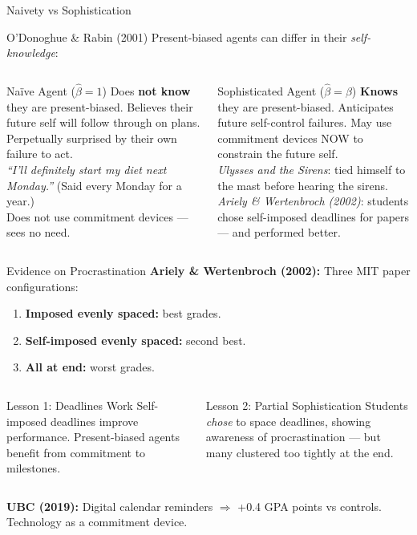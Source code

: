 \documentclass[aspectratio=169]{beamer}
\begin{document}
\begin{frame}{Naivety vs Sophistication}
\begin{block}{O'Donoghue \& Rabin (2001)}
Present-biased agents can differ in their \textit{self-knowledge}:
\end{block}
\begin{columns}
\begin{block}{\textcolor{berust}{Naïve Agent} ($\hat{\beta} = 1$)}
Does \textbf{not know} they are present-biased. Believes their future self will follow through on plans. Perpetually surprised by their own failure to act.\\[0.3em]
\textit{``I'll definitely start my diet next Monday.''} (Said every Monday for a year.)\\[0.3em]
Does not use commitment devices --- sees no need.
\end{block}
\begin{block}{\textcolor{beteal}{Sophisticated Agent} ($\hat{\beta} = \beta$)}
\textbf{Knows} they are present-biased. Anticipates future self-control failures. May use commitment devices NOW to constrain the future self.\\[0.3em]
\textit{Ulysses and the Sirens}: tied himself to the mast before hearing the sirens.\\[0.3em]
\textit{Ariely \& Wertenbroch (2002)}: students chose self-imposed deadlines for papers --- and performed better.
\end{block}
\end{columns}
\end{frame}

\begin{frame}{Evidence on Procrastination}
\textcolor{beblue}{\textbf{Ariely \& Wertenbroch (2002):}} Three MIT paper configurations:
\begin{enumerate}\small
  \item \textbf{Imposed evenly spaced:} best grades.
  \item \textbf{Self-imposed evenly spaced:} second best.
  \item \textbf{All at end:} worst grades.
\end{enumerate}
\begin{columns}
\begin{alertblock}{Lesson 1: Deadlines Work}
Self-imposed deadlines improve performance. Present-biased agents benefit from commitment to milestones.
\end{alertblock}
\begin{alertblock}{Lesson 2: Partial Sophistication}
Students \textit{chose} to space deadlines, showing awareness of procrastination --- but many clustered too tightly at the end.
\end{alertblock}
\end{columns}
\textcolor{beteal}{\textbf{UBC (2019):}} Digital calendar reminders $\Rightarrow$ +0.4 GPA points vs controls. Technology as a commitment device.
\end{frame}
\end{document}
